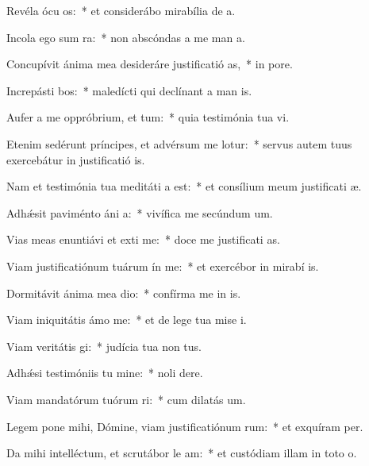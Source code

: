 \item Revéla ócu os:~* et considerábo mirabília de  a.
\item Incola ego sum  ra:~* non abscóndas a me man a.
\item Concupívit ánima mea desideráre justificatió as,~* in  pore.
\item Increpásti bos:~* maledícti qui declínant a man is.
\item Aufer a me oppróbrium, et tum:~* quia testimónia tua vi.
\item Etenim sedérunt príncipes, et advérsum me lotur:~* servus autem tuus exercebátur in justificatió is.
\item Nam et testimónia tua meditáti a est:~* et consílium meum justificati æ.
\item Adhǽsit paviménto áni a:~* vivífica me secúndum  um.
\item Vias meas enuntiávi et exti me:~* doce me justificati as.
\item Viam justificatiónum tuárum ín me:~* et exercébor in mirabí is.
\item Dormitávit ánima mea  dio:~* confírma me in  is.
\item Viam iniquitátis ámo  me:~* et de lege tua mise i.
\item Viam veritátis gi:~* judícia tua non  tus.
\item Adhǽsi testimóniis tu mine:~* noli  dere.
\item Viam mandatórum tuórum ri:~* cum dilatás  um.
\item Legem pone mihi, Dómine, viam justificatiónum rum:~* et exquíram  per.
\item Da mihi intelléctum, et scrutábor le am:~* et custódiam illam in toto  o.
